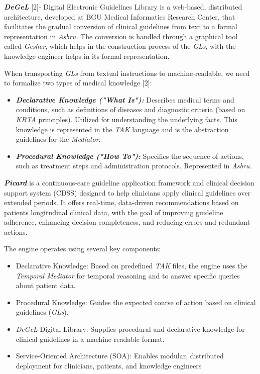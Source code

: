 \documentclass[
]{article}
\begin{document}
\emph{\textbf{DeGeL}} {[}2{]}- Digital Electronic Guidelines Library is
a web-based, distributed architecture, developed at BGU Medical
Informatics Research Center, that facilitates the gradual conversion of
clinical guidelines from text to a formal representation in
\emph{Asbru.} The conversion is handled through a graphical tool called
\emph{Gesher}, which helps in the construction process of the
\emph{GLs}, with the knowledge engineer helps in its formal
representation.

When transporting \emph{GLs} from textual instructions to
machine-readable, we need to formalize two types of medical knowledge
{[}2{]}:

\begin{itemize}
\item
  \emph{\textbf{Declarative Knowledge ("What Is"):}} Describes medical
  terms and conditions, such as definitions of diseases and diagnostic
  criteria (based on \emph{KBTA} principles). Utilized for understanding
  the underlying facts. This knowledge is represented in the \emph{TAK}
  language and is the abstraction guidelines for the \emph{Mediator}.
\item
  \emph{\textbf{Procedural Knowledge ("How To"):}} Specifies the
  sequence of actions, such as treatment steps and administration
  protocols. Represented in \emph{Asbru.}
\end{itemize}

\emph{\textbf{Picard}} is a continuous-care guideline application
framework and clinical decision support system (CDSS) designed to help
clinicians apply clinical guidelines over extended periods. It offers
real-time, data-driven recommendations based on
patients\textquotesingle{} longitudinal clinical data, with the goal of
improving guideline adherence, enhancing decision completeness, and
reducing errors and redundant actions.

The engine operates using several key components:

\begin{itemize}
\item
  Declarative Knowledge: Based on predefined \emph{TAK} files, the
  engine uses the \emph{Temporal Mediator} for temporal reasoning and to
  answer specific queries about patient data.
\item
  Procedural Knowledge: Guides the expected course of action based on
  clinical guidelines (\emph{GLs}).
\item
  \emph{DeGeL} Digital Library: Supplies procedural and declarative
  knowledge for clinical guidelines in a machine-readable format.
\item
  Service-Oriented Architecture (SOA): Enables modular, distributed
  deployment for clinicians, patients, and knowledge engineers
\end{itemize}
\end{document}
